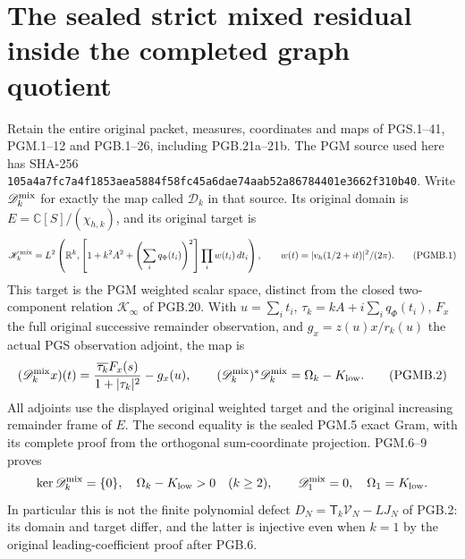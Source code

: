 \documentclass[11pt,a4paper]{article}
\theoremstyle{definition}
\begin{document}


\section{The sealed strict mixed residual inside the completed graph quotient}
\label{sec:pgmb}

Retain the entire original packet, measures, coordinates and maps
of PGS.1--41, PGM.1--12 and PGB.1--26, including PGB.21a--21b.
The PGM source used here has SHA-256
\texttt{105a4a7fc7a4f1853aea5884f58fc45a6dae74aab52a86784401e3662f310b40}.
Write $\mathscr D_k^{\rm mix}$ for exactly the map called
$\mathscr D_k$ in that source. Its original domain is
$E=\mathbb C[S]/(\chi_{h,k})$, and its original target is
\[
 \mathscr K_k^{\rm mix}
 =L^2\left(\mathbb R^k,
  \left[1+k^2A^2+\left(\sum_iq_\Phi(t_i)\right)^2\right]
                         \prod_iw(t_i)\,dt_i\right),
 \qquad w(t)=|v_h(1/2+it)|^2/(2\pi).
 \tag{PGMB.1}\label{eq:pgmb-domain}
\]
This target is the PGM weighted scalar space, distinct from the
closed two-component relation $\mathscr K_\infty$ of PGB.20.
With $u=\sum_it_i$, $\tau_k=kA+i\sum_iq_\Phi(t_i)$,
$F_x$ the full original successive remainder observation, and
$g_x=z(u)x/r_k(u)$ the actual PGS observation adjoint, the map is
\[
 (\mathscr D_k^{\rm mix}x)(t)
 =\frac{\overline{\tau_k}F_x(s)}{1+|\tau_k|^2}-g_x(u),
 \qquad
 (\mathscr D_k^{\rm mix})^*\mathscr D_k^{\rm mix}
                       =\Omega_k-K_{\rm low}.
 \tag{PGMB.2}\label{eq:pgmb-mixed-map}
\]
All adjoints use the displayed original weighted target and the
original increasing remainder frame of $E$. The second equality
is the sealed PGM.5 exact Gram, with its complete proof from the
orthogonal sum-coordinate projection. PGM.6--9 proves
\[
 \ker\mathscr D_k^{\rm mix}=\{0\},\quad
 \Omega_k-K_{\rm low}>0\quad(k\geq2),
 \qquad
 \mathscr D_1^{\rm mix}=0,\quad\Omega_1=K_{\rm low}.
\]
In particular this is not the finite polynomial defect
$D_N=\mathsf T_k\mathcal V_N-LJ_N$ of PGB.2: its domain and
target differ, and the latter is injective even when $k=1$ by
the original leading-coefficient proof after PGB.6.
\end{document}
